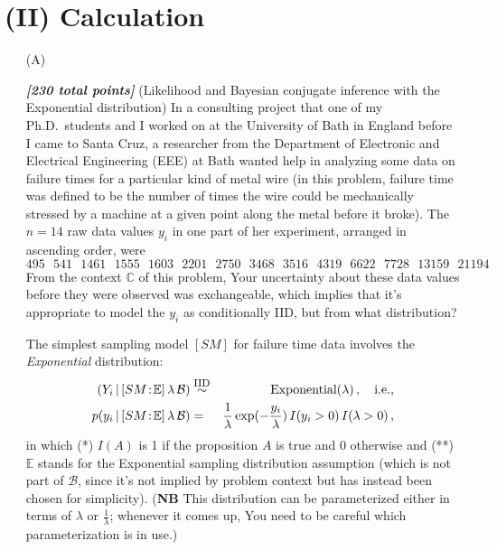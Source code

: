 \documentclass[12pt]{article}
\newcommand{\given}{\, | \,}
\newcommand{\bi}[1]{\b{\i{#1}}}
\renewcommand{\b}[1]{\textbf{#1}}
\renewcommand{\i}[1]{\textit{#1}}
\renewcommand{\r}[1]{\text{#1}}
\begin{document}
\section*{(II) Calculation}

\begin{itemize}

\item[(A)]

\bi{[230 total points]} (Likelihood and Bayesian conjugate inference with the Exponential distribution) In a consulting project that one of my Ph.D.~students and I worked on at the University of Bath in England before I came to Santa Cruz, a researcher from the Department of Electronic and Electrical Engineering (EEE) at Bath wanted help in analyzing some data on failure times for a particular kind of metal wire (in this problem, failure time was defined to be the number of times the wire could be mechanically stressed by a machine at a given point along the metal before it broke). The $n = 14$ raw data values $y_i$ in one part of her experiment, arranged in ascending order, were 
\[ 
495 \ \ \ 541 \ \ \ 1461 \ \ \ 1555 \ \ \ 1603 \ \ \ 2201 \ \ \ 2750 \ \ \
3468 \ \ \ 3516 \ \ \ 4319 \ \ \ 6622 \ \ \ 7728 \ \ \ 13159 \ \ \ 21194 
\] 
From the context $\mathbb{ C }$ of this problem, Your uncertainty about these data values before they were observed was exchangeable, which implies that it's appropriate to model the $y_i$ as conditionally IID, but from what distribution?

The simplest sampling model $[ SM ]$ for failure time data involves the \textit{Exponential} distribution: 
\begin{eqnarray} \label{e:exponential-model-1}
( Y_i \given [ SM \! : \! \mathbb{ E } ] \, \lambda \, \mathcal{ B } ) & \stackrel{ \mbox{\footnotesize IID} }{ \sim } & \textrm{Exponential} ( \lambda ) \, , \ \ \ \r{i.e.,} \nonumber \\ p( y_i \given [ SM \! : \! \mathbb{ E } ] \, \lambda \,  \mathcal{ B } ) & = & \frac{ 1 }{ \lambda } \exp( - \frac{ y_i }{ \lambda } ) \, I ( y_i > 0 ) \, I ( \lambda > 0 ) \, ,
\end{eqnarray}
in which (*) $I ( A )$ is 1 if the proposition $A$ is true and 0 otherwise and (**) $\mathbb{ E }$ stands for the Exponential sampling distribution assumption (which is not part of $\mathcal{ B }$, since it's not implied by problem context but has instead been chosen for simplicity). (\textbf{NB} This distribution can be parameterized either in terms of $\lambda$ or $\frac{ 1 }{ \lambda }$; whenever it comes up, You need to be careful which parameterization is in use.)


\end{itemize}
\end{document}
